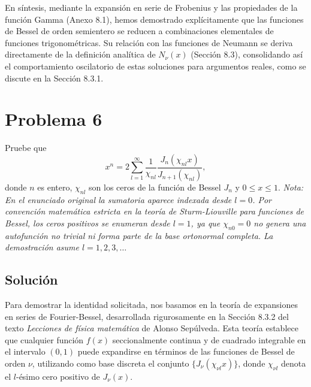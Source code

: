 \documentclass[a4paper]{article}
\begin{document}
En síntesis, mediante la expansión en serie de Frobenius y las propiedades de la función Gamma (Anexo 8.1), hemos demostrado explícitamente que las funciones de Bessel de orden semientero se reducen a combinaciones elementales de funciones trigonométricas. Su relación con las funciones de Neumann se deriva directamente de la definición analítica de $N_\nu(x)$ (Sección 8.3), consolidando así el comportamiento oscilatorio de estas soluciones para argumentos reales, como se discute en la Sección 8.3.1.

\section{Problema 6}
Pruebe que
$$x^n = 2 \sum_{l=1}^{\infty} \frac{1}{\chi_{nl}} \frac{J_n(\chi_{nl} x)}{J_{n+1}(\chi_{nl})},$$
donde $n$ es entero, $\chi_{nl}$ son los ceros de la función de Bessel $J_n$ y $0 \le x \le 1$.
\textit{Nota: En el enunciado original la sumatoria aparece indexada desde $l=0$. Por convención matemática estricta en la teoría de Sturm-Liouville para funciones de Bessel, los ceros positivos se enumeran desde $l=1$, ya que $\chi_{n0}=0$ no genera una autofunción no trivial ni forma parte de la base ortonormal completa. La demostración asume $l=1,2,3,\dots$}

\subsection{Solución}
Para demostrar la identidad solicitada, nos basamos en la teoría de expansiones en series de Fourier-Bessel, desarrollada rigurosamente en la Sección 8.3.2 del texto \textit{Lecciones de física matemática} de Alonso Sepúlveda. Esta teoría establece que cualquier función $f(x)$ seccionalmente continua y de cuadrado integrable en el intervalo $(0, 1)$ puede expandirse en términos de las funciones de Bessel de orden $\nu$, utilizando como base discreta el conjunto $\{J_\nu(\chi_{\nu l} x)\}$, donde $\chi_{\nu l}$ denota el $l$-ésimo cero positivo de $J_\nu(x)$.
\end{document}
